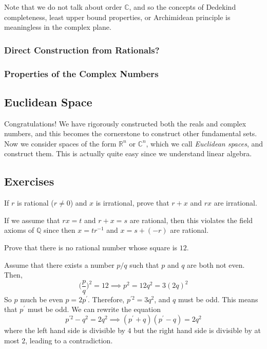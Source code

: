 \documentclass{article}
\begin{document}
    Note that we do not talk about order $\mathbb{C}$, and so the concepts of Dedekind completeness, least upper bound properties, or Archimidean principle is meaningless in the complex plane. 

    \subsubsection{Direct Construction from Rationals?}

    \subsubsection{Properties of the Complex Numbers} 
  
  \subsection{Euclidean Space} 

    Congratulations! We have rigorously constructed both the reals and complex numbers, and this becomes the cornerstone to construct other fundamental sets. Now we consider spaces of the form $\mathbb{R}^n$ or $\mathbb{C}^n$, which we call \textit{Euclidean spaces}, and construct them. This is actually quite easy since we understand linear algebra. 
  
  \subsection{Exercises} 

    \begin{exercise}[Rudin 1.1]
    If $r$ is rational ($r \neq 0$) and $x$ is irrational, prove that $r + x$ and $rx$ are irrational. 
    \end{exercise}
    \begin{solution}
    If we assume that $r x = t$ and $r + x = s$ are rational, then this violates the field axioms of $\mathbb{Q}$ since then $x = t r^{-1}$ and $x = s + (-r)$ are rational. 
    \end{solution}

    \begin{exercise}[Rudin 1.2]
    Prove that there is no rational number whose square is $12$. 
    \end{exercise}
    \begin{solution}
    Assume that there exists a number $p/q$ such that $p$ and $q$ are both not even. Then, 
    \[\bigg( \frac{p}{q} \bigg)^2 = 12 \implies p^2 = 12q^2 = 3 (2 q)^2\]
    So $p$ much be even $p = 2 p^\prime$. Therefore, $p^{\prime 2} = 3 q^2$, and $q$ must be odd. This means that $p^\prime$ must be odd. We can rewrite the equation 
    \[p^{\prime 2} - q^2 = 2 q^2 \implies (p^\prime + q) (p^\prime - q) = 2q^2\]
    where the left hand side is divisible by $4$ but the right hand side is divisible by at most $2$, leading to a contradiction. 
    \end{solution}
\end{document}
